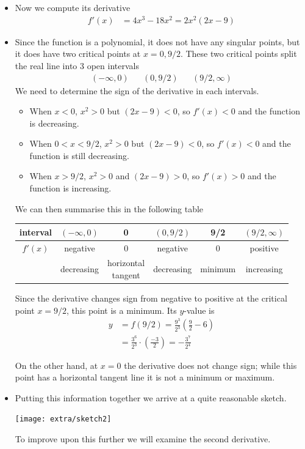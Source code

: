 \begin{eg}
\begin{itemize}
\item Now we compute its derivative
\begin{align*}
  f'(x) &= 4x^3-18x^2 = 2x^2(2x-9)
\end{align*}
\item Since the function is a polynomial, it does not have any singular points, but it
does have two critical points at $x=0, 9/2$. These two critical points split the real
line into 3 open intervals
\begin{align*}
  (-\infty, 0) && (0,9/2) && (9/2,\infty)
\end{align*}
We need to determine the sign of the derivative in each intervals.
\begin{itemize}
\item When $x<0$, $x^2>0$ but $(2x-9)<0$, so $f'(x)<0$ and the function is decreasing.
\item When $0<x<9/2$, $x^2>0$ but $(2x-9)<0$, so $f'(x)<0$ and the function is
still decreasing.
\item When $x>9/2$, $x^2>0$ and $(2x-9)>0$, so $f'(x)>0$ and the function is increasing.
\end{itemize}
We can then summarise this in the following table
\begin{center}
\begin{tabular}{|c|c||c||c||c||c|}
\hline
interval & $(-\infty,0)$ & 0 & $(0,9/2)$ &
9/2 & $(9/2,\infty)$\\
\hline
$f'(x)$ & negative & 0 &
negative & 0 & positive \\
\hline
& decreasing & \parbox[c]{21mm}{\centering horizontal\\ tangent }
& decreasing & minimum & increasing
\\
\hline
\end{tabular}
\end{center}
Since the derivative changes sign from negative to positive at the critical point
$x=9/2$, this point is a minimum. Its $y$-value is
\begin{align*}
  y&=f(9/2) = \frac{9^3}{2^3}\left(\frac{9}{2} - 6\right)\\
  &= \frac{3^6}{2^3} \cdot \left(\frac{-3}{2} \right) = -\frac{3^7}{2^4}
\end{align*}


On the other hand, at $x=0$ the derivative
does not change sign; while this point has a horizontal tangent line it is not a minimum
or maximum.

\item Putting this information together we arrive at a quite reasonable sketch.
\begin{efig}
 \begin{center}
  \texttt{[image: extra/sketch2]}
 \end{center}
\end{efig}
To improve upon this further we will examine the second derivative.
\end{itemize}
\end{eg}


